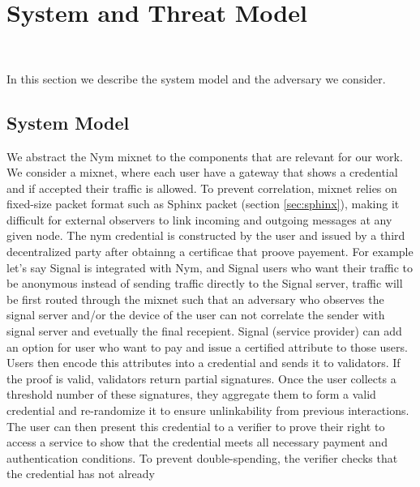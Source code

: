 \section{System and Threat Model}~\label{sec:sys_model}

In this section we describe the system model and the adversary we consider.

\subsection{System Model}

%
%
We abstract the Nym mixnet to the components that are relevant for our
work. We consider a mixnet, where each user have a gateway that shows a
credential and if accepted their traffic is allowed.  To prevent
correlation, mixnet relies on fixed-size packet format such as Sphinx
packet (section \ref{sec:sphinx}), making it difficult for external
observers to link incoming and outgoing messages at any given node.  The
nym credential is constructed by the user and issued by a third
decentralized party after obtainng a certificae that proove payement.  For
example let's say Signal is integrated with Nym, and Signal users who want
their traffic to be anonymous instead of sending traffic directly to the
Signal server, traffic will be first routed through the mixnet such that an
adversary who observes the signal server and/or the device of the user can
not correlate the sender with signal server and evetually the final
recepient. Signal (service provider) can add an option for user who want to
pay and issue a certified attribute to those users. Users then encode this
attributes into a credential and sends it to validators. If the proof is
valid, validators return partial signatures. Once the user collects a
threshold number of these signatures, they aggregate them to form a valid
credential and re-randomize it to ensure unlinkability from previous
interactions. The user can then present this credential to a verifier to
prove their right to access a service to show that the credential meets all
necessary payment and authentication conditions. To prevent
double-spending, the verifier checks that the credential has not already
